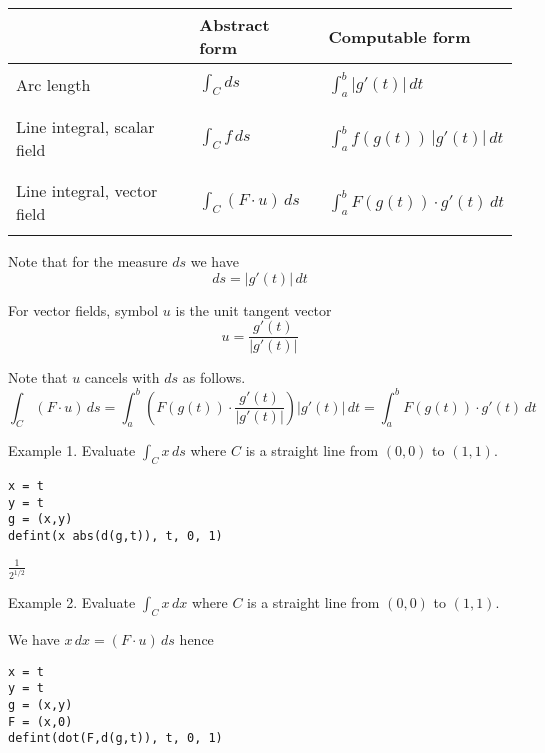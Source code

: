 \documentclass[12pt]{article}
\begin{document}
\begin{center}
\begin{tabular}{|l|l|l|}
\hline
& Abstract form
& Computable form
\\
\hline
& &\\
Arc length
& $\displaystyle{\int_C ds}$
& $\displaystyle{\int_a^b |g'(t)|\,dt}$\\
& &\\
\hline
 & & \\
Line integral, scalar field
& $\displaystyle{\int_C f\,ds}$
& $\displaystyle{\int_a^b f(g(t))\,|g'(t)|\,dt}$\\
& &\\
\hline
 & & \\
Line integral, vector field
& $\displaystyle{\int_C(F\cdot u)\,ds}$
& $\displaystyle{\int_a^b F(g(t))\cdot g'(t)\,dt}$\\
 & & \\
\hline
\end{tabular}
\end{center}

Note that for the measure $ds$ we have
\begin{equation*}
ds=|g'(t)|\,dt
\end{equation*}

For vector fields, symbol $u$ is the unit tangent vector
\begin{equation*}
u=\frac{g'(t)}{|g'(t)|}
\end{equation*}

Note that $u$ cancels with $ds$ as follows.
\begin{equation*}
\int_C(F\cdot u)\,ds
=\int_a^b
\left(F(g(t))\cdot\frac{g'(t)}{|g'(t)|}\right)
|g'(t)|\,dt
=\int_a^b F(g(t))\cdot g'(t)\,dt
\end{equation*}

Example 1. Evaluate $\int_Cx\,ds$
where $C$ is a straight line from $(0,0)$ to $(1,1)$.

{\color{blue}
\begin{verbatim}
x = t
y = t
g = (x,y)
defint(x abs(d(g,t)), t, 0, 1)
\end{verbatim}}

$\displaystyle \frac{1}{2^{1/2}}$

\bigskip
Example 2. Evaluate $\int_Cx\,dx$
where $C$ is a straight line from $(0,0)$ to $(1,1)$.

\bigskip
We have $x\,dx=(F\cdot u)\,ds$ hence

{\color{blue}
\begin{verbatim}
x = t
y = t
g = (x,y)
F = (x,0)
defint(dot(F,d(g,t)), t, 0, 1)
\end{verbatim}}
\end{document}
